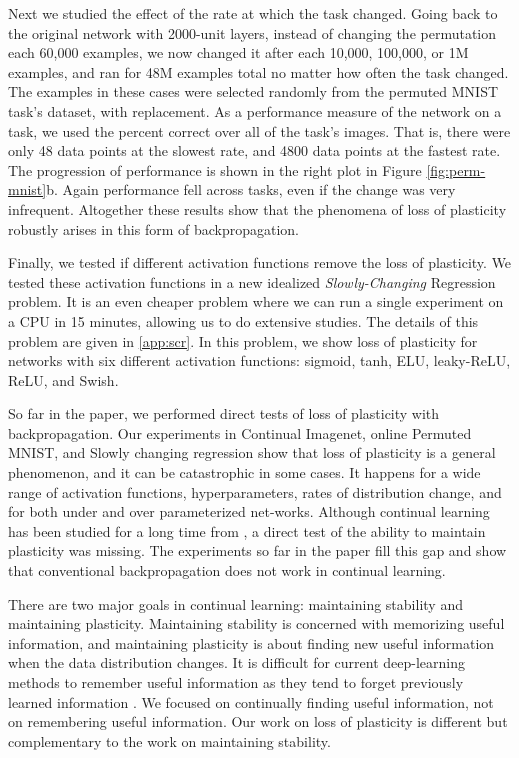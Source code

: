 \documentclass[review, number,3p]{elsarticle}
\begin{document}
Next we studied the effect of the rate at which the task changed.
Going back to the original network with 2000-unit layers, instead of changing the permutation  each 60,000 examples, we now changed it after each 10,000, 100,000, or 1M examples, and ran for 48M examples total no matter how often the task changed.
The examples in these cases were selected randomly from the permuted MNIST task's dataset, with replacement. 
As a performance measure of the network on a task, we used the percent correct over all of the task's images. That is, there were only 48 data points at the slowest rate, and 4800 data points at the fastest rate.
The progression of performance is shown in the right plot in Figure \ref{fig:perm-mnist}b. 
Again performance fell across tasks, even if the change was very infrequent.
Altogether these results show that the phenomena of loss of plasticity robustly arises in this form of backpropagation.

Finally, we tested if different activation functions remove the loss of plasticity. 
We tested these activation functions in a new idealized \emph{Slowly-Changing} Regression problem. 
It is an even cheaper problem where we can run a single experiment on a CPU in 15 minutes, allowing us to do extensive studies. 
The details of this problem are given in \ref{app:scr}.
In this problem, we show loss of plasticity for networks with six different activation functions: sigmoid, tanh, ELU, leaky-ReLU, ReLU, and Swish.

So far in the paper, we performed direct tests of loss of plasticity with backpropagation.
Our experiments in Continual Imagenet, online Permuted MNIST, and Slowly changing regression show that loss of plasticity is a general phenomenon, and it can be catastrophic in some cases.
It happens for a wide range of activation functions, hyperparameters, rates of distribution change, and for both under and over parameterized net-works.
Although continual learning has been studied for a long time from \cite{caruana1997, ring1998, parisi2019}, a direct test of the ability to maintain plasticity was missing.
The experiments so far in the paper fill this gap and show that conventional backpropagation does not work in continual learning. 

There are two major goals in continual learning: maintaining stability and maintaining plasticity. 
Maintaining stability is concerned with memorizing useful information, and maintaining plasticity is about finding new useful information when the data distribution changes. 
It is difficult for current deep-learning methods to remember useful information as they tend to forget previously learned information \cite{mccloskey1989, french1999, parisi2019}.
We focused on continually finding useful information, not on remembering useful information.
Our work on loss of plasticity is different but complementary to the work on maintaining stability.
\end{document}
